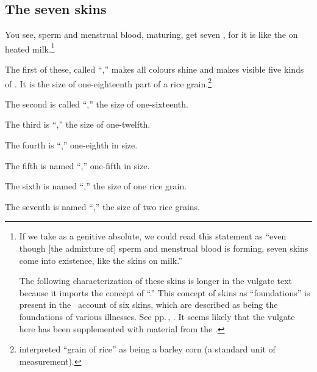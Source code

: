 \begin{translation}
\subsection{The seven skins}

\item[4]

You see, sperm and menstrual blood, maturing, get seven
, for it is like the  on heated
milk.\footnote{If we take  as a
    genitive absolute, we could read this statement as “even though [the
    admixture of] sperm and menstrual blood is forming, seven skins come
    into existence, like the skins on milk.”
    
 The following characterization of these skins is longer in the
vulgate text because it imports the concept of
“.”  This concept of skins as
“foundations” is present in the \CS\ account of six skins, which are
described as being the foundations of various illnesses. See
pp.\,\pageref{ka4:kalā}, \pageref{sa4:kalā}.  It seems likely that
the vulgate here has been supplemented with material from the \CS.}

The first  of these, called  “,”  makes all
colours shine and makes  visible five kinds of .
It is the size of one-eighteenth part of a rice
grain.\footnote{ interpreted  “grain of
    rice” as being a barley corn (a standard unit of measurement).}

The second is called “,” the size of one-sixteenth.
  
The third is “,” the size of one-twelfth. 
 
The fourth is “,” one-eighth in size. 
 
The fifth is named “,” one-fifth in size. 
 
The sixth is named “,” the size of one rice grain.

The seventh is named  “,”  the size of
two rice grains.
 

\end{translation}
